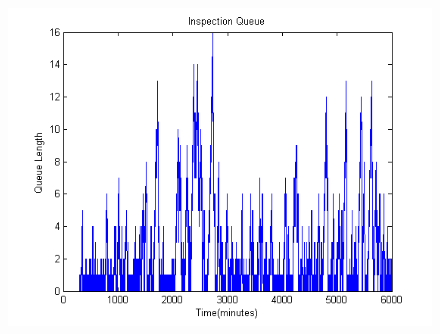 \documentclass[aps,letterpaper,10pt]{revtex4}
\begin{document}
\begin{itemize}
\begin{figure}[htp]
\begin{center}
{                            \includegraphics[scale=0.5]{../analysis/8/Images/inspection_queue.png}
                        }
                        \end{center}
                    \end{figure}
            \end{itemize}

        \newpage
\end{document}
